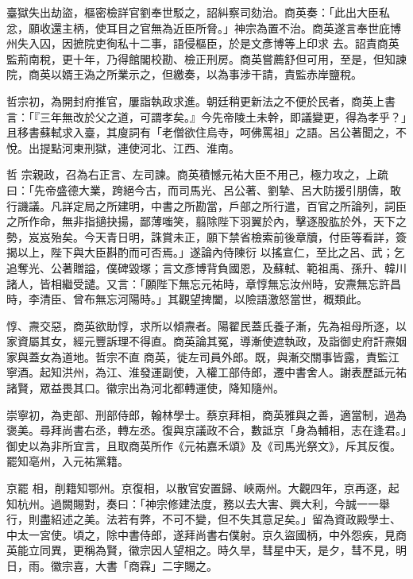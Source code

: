 \begin{pinyinscope}
 臺獄失出劫盜，樞密檢詳官劉奉世駁之，詔糾察司劾治。商英奏：「此出大臣私忿，願收還主柄，使耳目之官無為近臣所脅。」神宗為置不治。商英遂言奉世庇博州失入囚，因摭院吏徇私十二事，語侵樞臣，於是文彥博等上印求
 去。詔責商英監荊南稅，更十年，乃得館閣校勘、檢正刑房。商英嘗薦舒但可用，至是，但知諫院，商英以婿王溈之所業示之，但繳奏，以為事涉干請，責監赤岸鹽稅。



 哲宗初，為開封府推官，屢詣執政求進。朝廷稍更新法之不便於民者，商英上書言：「『三年無改於父之道，可謂孝矣。』今先帝陵土未幹，即議變更，得為孝乎？」且移書蘇軾求入臺，其廋詞有「老僧欲住烏寺，呵佛罵祖」之語。呂公著聞之，不悅。出提點河東刑獄，連使河北、江西、淮南。



 哲
 宗親政，召為右正言、左司諫。商英積憾元祐大臣不用己，極力攻之，上疏曰：「先帝盛德大業，跨絕今古，而司馬光、呂公著、劉摯、呂大防援引朋儔，敢行譏議。凡詳定局之所建明，中書之所勘當，戶部之所行遣，百官之所論列，詞臣之所作命，無非指擿抉揚，鄙薄嗤笑，翦除陛下羽翼於內，擊逐股肱於外，天下之勢，岌岌殆矣。今天青日明，誅賞未正，願下禁省檢索前後章牘，付臣等看詳，簽揭以上，陛下與大臣斟酌而可否焉。」遂論內侍陳衍
 以搖宣仁，至比之呂、武；乞追奪光、公著贈謚，僕碑毀塚；言文彥博背負國恩，及蘇軾、範祖禹、孫升、韓川諸人，皆相繼受譴。又言：「願陛下無忘元祐時，章惇無忘汝州時，安燾無忘許昌時，李清臣、曾布無忘河陽時。」其觀望捭闔，以險語激怒當世，概類此。



 惇、燾交惡，商英欲助惇，求所以傾燾者。陽翟民蓋氏養子漸，先為祖母所逐，以家資屬其女，經元豐訴理不得直。商英論其冤，導漸使遮執政，及詣御史府訐燾姻家與蓋女為道地。哲宗不直
 商英，徙左司員外郎。既，與漸交關事皆露，責監江寧酒。起知洪州，為江、淮發運副使，入權工部侍郎，遷中書舍人。謝表歷詆元祐諸賢，眾益畏其口。徽宗出為河北都轉運使，降知隨州。



 崇寧初，為吏部、刑部侍郎，翰林學士。蔡京拜相，商英雅與之善，適當制，過為褒美。尋拜尚書右丞，轉左丞。復與京議政不合，數詆京「身為輔相，志在逢君。」御史以為非所宜言，且取商英所作《元祐嘉禾頌》及《司馬光祭文》，斥其反復。罷知亳州，入元祐黨籍。



 京罷
 相，削籍知鄂州。京復相，以散官安置歸、峽兩州。大觀四年，京再逐，起知杭州。過闕賜對，奏曰：「神宗修建法度，務以去大害、興大利，今誠一一舉行，則盡紹述之美。法若有弊，不可不變，但不失其意足矣。」留為資政殿學士、中太一宮使。頃之，除中書侍郎，遂拜尚書右僕射。京久盜國柄，中外怨疾，見商英能立同異，更稱為賢，徽宗因人望相之。時久旱，彗星中天，是夕，彗不見，明日，雨。徽宗喜，大書「商霖」二字賜之。




\end{pinyinscope}
